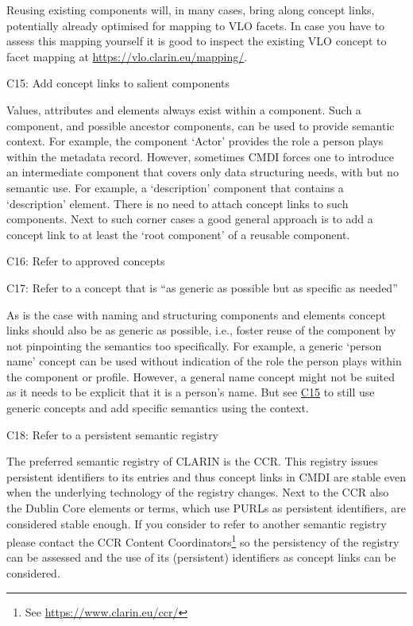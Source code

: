 Reusing existing components will, in many cases, bring along concept links, potentially already optimised for mapping to VLO facets. In case you have to assess this mapping yourself it is good to inspect the existing VLO concept to facet mapping at \url{https://vlo.clarin.eu/mapping/}.

\label{c15}
C15: Add concept links to salient components

 

Values, attributes and elements always exist within a component. Such a component, and possible ancestor components, can be used to provide semantic context. For example, the component `Actor' provides the role a person plays within the metadata record. However, sometimes CMDI forces one to introduce an intermediate component that covers only data
structuring needs, with but no semantic use. For example, a
`description' component that contains a `description' element. There is no need to attach concept links to such components. Next to such corner cases a good general approach is to add a concept link to at least the `root component' of a reusable component.

\begin{workinprogress}
C16: Refer to approved concepts
 
\end{workinprogress}

C17: Refer to a concept that is ``as generic as possible but as specific as needed''


As is the case with naming and structuring components and elements concept links should also be as generic as possible, i.e., foster reuse of the component by not pinpointing the semantics too specifically. For example, a generic `person name' concept can be used without indication of the role the person plays within the component or profile. However, a general name concept might not be suited as it needs to be explicit that it is a person's name. But see \hyperref[c15]{C15} to still use generic concepts and add specific semantics using the context.

C18: Refer to a persistent semantic registry


The preferred semantic registry of CLARIN is the CCR. This registry issues persistent identifiers to its entries and thus concept links in CMDI are stable even when the underlying technology of the registry changes. Next to the CCR also the Dublin Core elements or terms, which use PURLs as persistent identifiers, are considered stable enough. If you consider to refer to another semantic registry please contact the
CCR Content Coordinators\footnote{See \url{https://www.clarin.eu/ccr/}} so the persistency of the registry can be assessed and the use of its (persistent) identifiers as concept links can be considered.

